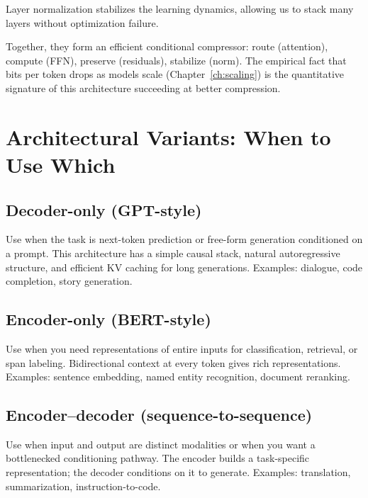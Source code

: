 Layer normalization stabilizes the learning dynamics, allowing us to stack many layers without optimization failure.

Together, they form an efficient conditional compressor: route (attention), compute (FFN), preserve (residuals), stabilize (norm). The empirical fact that bits per token drops as models scale (Chapter~\ref{ch:scaling}) is the quantitative signature of this architecture succeeding at better compression.

\vspace{1.2em}

\section{Architectural Variants: When to Use Which}
\label{sec:variants}

\subsection{Decoder-only (GPT-style)}
Use when the task is next-token prediction or free-form generation conditioned on a prompt. This architecture has a simple causal stack, natural autoregressive structure, and efficient KV caching for long generations. Examples: dialogue, code completion, story generation.

\subsection{Encoder-only (BERT-style)}
Use when you need representations of entire inputs for classification, retrieval, or span labeling. Bidirectional context at every token gives rich representations. Examples: sentence embedding, named entity recognition, document reranking.

\subsection{Encoder--decoder (sequence-to-sequence)}
Use when input and output are distinct modalities or when you want a bottlenecked conditioning pathway. The encoder builds a task-specific representation; the decoder conditions on it to generate. Examples: translation, summarization, instruction-to-code.

\vspace{1.2em}

